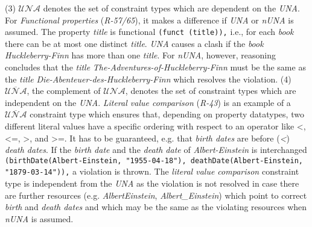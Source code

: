 \documentclass{acm_proc_article-sp}
\newcommand{\ms}[1]{%
  \texttt{#1}
}
\begin{document}
(3) $\mathcal{UNA}$ denotes the set of constraint types which are dependent on the \emph{UNA}.
For \emph{Functional properties} (\emph{R-57/65}), it makes a difference if \emph{UNA} or \emph{nUNA} is assumed.
The property \emph{title} is functional {\small\ms{(funct (title)),}} i.e., for each \emph{book} there can be at most one distinct \emph{title}.
\emph{UNA} causes a clash
if the \emph{book} {\em Huckleberry-Finn} has more than one \emph{title}.
For \emph{nUNA}, however, reasoning concludes that the \emph{title} {\em The-Adventures-of-Huckleberry-Finn} must be the same as the \emph{title} {\em Die-Abenteuer-des-Huckleberry-Finn} 
which resolves the violation. 
(4) $\overline{\mathcal{UNA}}$, the complement of $\mathcal{UNA}$, denotes the set of constraint types which are independent on the \emph{UNA}.
\emph{Literal value comparison} (\emph{R-43}) is an example of a $\overline{\mathcal{UNA}}$ constraint type
which ensures that,
depending on property datatypes,
two different literal values have
a specific ordering with respect to an operator like \textless, \textless=, \textgreater, and \textgreater=.
It has to be guaranteed, e.g. that \emph{birth dates} are before (\emph{\textless}) \emph{death dates}.
If the \emph{birth date} and the \emph{death date} of \emph{Albert-Einstein} is interchanged
{\small\ms{(birthDate(Albert-Einstein, "1955-04-18"), deathDate(Albert-Einstein, "1879-03-14")),}}
a violation is thrown.
The \emph{literal value comparison} constraint type is independent from the \emph{UNA}
as the violation is not resolved 
in case there are further resources (e.g. \emph{AlbertEinstein}, \emph{Albert\_Einstein}) which point to correct \emph{birth} and \emph{death dates}
and which may be the same as the violating resources when \emph{nUNA} is assumed.
\end{document}
